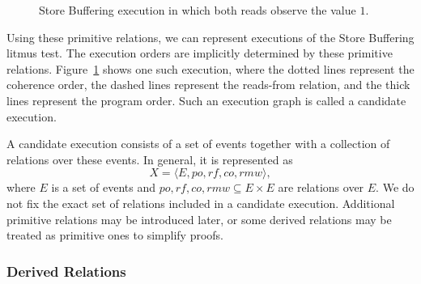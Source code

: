 \begin{figure}[htbp]
\centering
{}
\caption{Store Buffering execution in which both reads observe the value $1$.}
\label{fig:litmus-execution-primitive-relation}
\end{figure}

Using these primitive relations, we can represent executions of the Store Buffering litmus test. The execution orders are implicitly determined by these primitive relations. Figure~\ref{fig:litmus-execution-primitive-relation} shows one such execution, where the dotted lines represent the coherence order, the dashed lines represent the reads-from relation, and the thick lines represent the program order. Such an execution graph is called a candidate execution.

A candidate execution consists of a set of events together with a collection of
relations over these events. In general, it is represented as
\[
X = \langle E, \mathit{po}, \mathit{rf}, \mathit{co}, \mathit{rmw} \rangle,
\]
where $E$ is a set of events and $\mathit{po}, \mathit{rf}, \mathit{co}, \mathit{rmw} \subseteq E \times E$ are
relations over $E$. We do not fix the exact set of relations included in a candidate execution.
Additional primitive relations may be introduced later, or some derived
relations may be treated as primitive ones to simplify proofs.


\subsubsection{Derived Relations}

